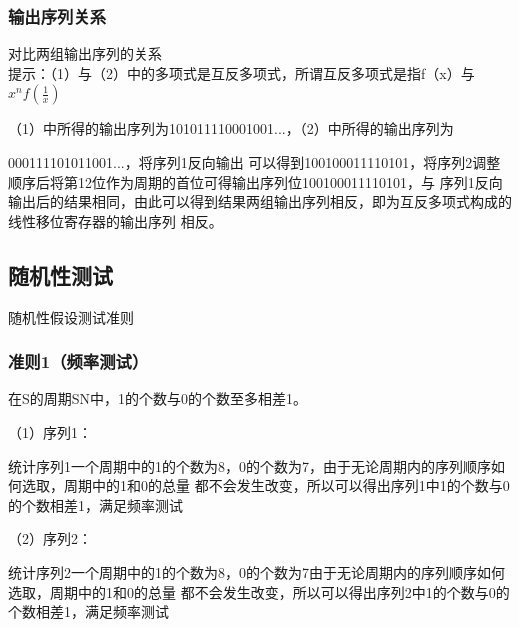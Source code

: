 \documentclass[a4paper,11pt,UTF8]{ctexart}
\begin{document}
    \subsubsection{输出序列关系}
      对比两组输出序列的关系\\
      提示：（1）与（2）中的多项式是互反多项式，所谓互反多项式是指f（x）与$x^{n} f(\frac{1}{x} )$\par
      （1）中所得的输出序列为101011110001001...，（2）中所得的输出序列为\par
      000111101011001...，将序列1反向输出
      可以得到100100011110101，将序列2调整顺序后将第12位作为周期的首位可得输出序列位100100011110101，与
      序列1反向输出后的结果相同，由此可以得到结果两组输出序列相反，即为互反多项式构成的线性移位寄存器的输出序列
      相反。
      
  \subsection{随机性测试}
    随机性假设测试准则

    \subsubsection{准则1（频率测试）}
      在S的周期SN中，1的个数与0的个数至多相差1。\par
      （1）序列1：\par
      统计序列1一个周期中的1的个数为8，0的个数为7，由于无论周期内的序列顺序如何选取，周期中的1和0的总量
      都不会发生改变，所以可以得出序列1中1的个数与0的个数相差1，满足频率测试\par
      （2）序列2：\par
      统计序列2一个周期中的1的个数为8，0的个数为7由于无论周期内的序列顺序如何选取，周期中的1和0的总量
      都不会发生改变，所以可以得出序列2中1的个数与0的个数相差1，满足频率测试\par
\end{document}
